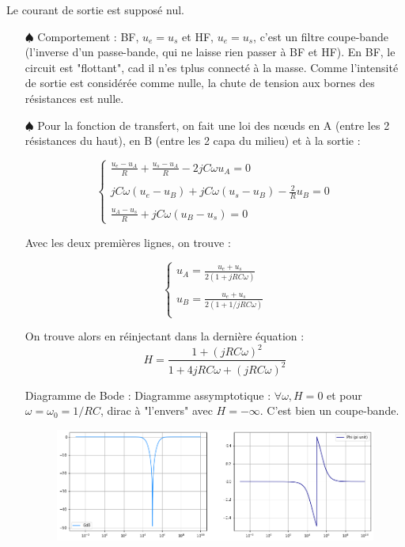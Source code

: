 \documentclass{report}
\begin{document}
Le courant de sortie est supposé nul.

\begin{itemize}
	\item[$\spadesuit$] Comportement : BF, $u_e=u_s$ et HF, $u_e=u_s$, c'est un filtre coupe-bande (l'inverse d'un passe-bande, qui ne laisse rien passer à BF et HF). En BF, le circuit est "flottant", cad il n'es tplus connecté à la masse. Comme l'intensité de sortie est considérée comme nulle, la chute de tension aux bornes des résistances est nulle.
	
	\item[$\spadesuit$]
		Pour la fonction de transfert, on fait une loi des nœuds en A (entre les 2 résistances du haut), en B (entre les 2 capa du milieu) et à la sortie :
		
\begin{equation}
	\left\lbrace
	\begin{array}{lll}
		 \frac{u_e-u_A}{R} + \frac{u_s-u_A}{R} -2jC\omega u_A = 0\\
		 \\
		 jC\omega(u_e-u_B) +  jC\omega(u_s-u_B) - \frac{2}{R}u_B =0  \\
		 \\
		 \frac{u_A-u_s}{R} + jC\omega(u_B-u_s)=0
	\end{array}\right.
\end{equation}

Avec les deux premières lignes, on trouve :

\begin{equation}
	\left\lbrace
	\begin{array}{lll}
		 u_A = \frac{u_e+u_s}{2(1+jRC\omega)}\\
		 \\
		 u_B = \frac{u_e+u_s}{2(1+1/jRC\omega)} \\
	\end{array}\right.
\end{equation}

	On trouve alors en réinjectant dans la dernière équation :
	\begin{equation}
		H =\frac{1+(jRC\omega)^2}{1+4jRC\omega + (jRC\omega)^2}
	\end{equation}
	
	Diagramme de Bode :
Diagramme assymptotique :  $\forall \omega, H=0$ et pour $\omega=\omega_0=1/RC$, dirac à "l'envers" avec $H=-\infty$. C'est bien un coupe-bande.
\begin{figure}[!h]
	\centering
	\includegraphics[width=0.8\linewidth]{exo3_0.png}
\end{figure}



\end{itemize}
\end{document}
